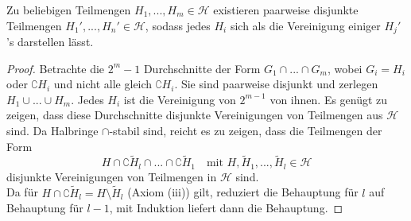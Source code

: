 \begin{lemma}
\begin{mdframed}
Zu beliebigen Teilmengen $H_1,...,H_m \in \mathcal{H}$ existieren paarweise disjunkte Teilmengen $H_1',...,H_n' \in \mathcal{H}$, sodass jedes $H_i$ sich als die Vereinigung einiger $H_j'$'s darstellen lässt.
 \label{lemmaA}
\end{mdframed}
\begin{proof}
Betrachte die $2^m-1$ Durchschnitte der Form $G_1 \cap ... \cap G_m$, wobei $G_i = H_i$ oder $\complement H_i$ und nicht alle gleich $\complement H_i$. Sie sind paarweise disjunkt und zerlegen $H_1 \cup ... \cup H_m$. Jedes $H_i$ ist die Vereinigung von $2^{m-1}$ von ihnen. Es genügt zu zeigen, dass diese Durchschnitte disjunkte Vereinigungen von Teilmengen aus $\mathcal{H}$ sind. Da Halbringe $\cap$-stabil sind, reicht es zu zeigen, dass die Teilmengen der Form
\begin{equation*}
H \cap \complement \widetilde{H}_l \cap ... \cap \complement \widetilde{H}_1	\quad \text{mit }H,\widetilde{H}_1,...,\widetilde{H}_l \in \mathcal{H}
\end{equation*}
disjunkte Vereinigungen von Teilmengen in $\mathcal{H}$ sind. \\
Da für $H \cap \complement \widetilde{H}_l = H \setminus \widetilde{H}_l$ (Axiom (iii)) gilt, reduziert die Behauptung für $l$ auf Behauptung für $l-1$, mit Induktion liefert dann die Behauptung.
\end{proof}
\end{lemma}


